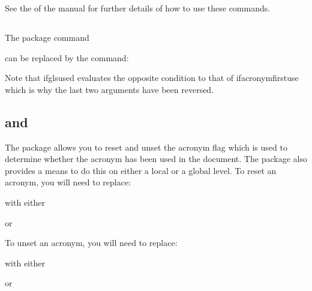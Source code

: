 \documentclass[titlepage=false,oneside,
 fontsize=12pt,captions=tableheading]{scrarticle}
\newenvironment{oldway}
{\begin{codebox*}[title={\styfmt{glossary.sty}}]}
{\end{codebox*}}
\newenvironment{newway}
{\begin{codebox*}[title={\styfmt{glossaries.sty}}]}
{\end{codebox*}}
\begin{document}
See the 
of the  manual for further details of
how to use these commands.

\subsection{}

The  package command
\begin{oldway}
\end{oldway}%
can be replaced by the  command:
\begin{newway}
\end{newway}%
Note that \gls{ifglsused} evaluates the opposite condition to
that of \gls{ifacronymfirstuse} which is why the last two arguments
have been reversed.

\subsection{ and }
\label{sec:unreset}

The  package allows you to reset and unset the
acronym flag which is used to determine whether the acronym has
been used in the document. The  package also
provides a means to do this on either a local or a global level.
To reset an acronym, you will need to replace:
\begin{oldway}
\end{oldway}%
with either
\begin{newway}
\end{newway}%
or
\begin{newway}
\end{newway}

To unset an acronym, you will need to replace:
\begin{oldway}
\end{oldway}%
with either
\begin{newway}
\end{newway}%
or
\begin{newway}
\end{newway}
\end{document}
